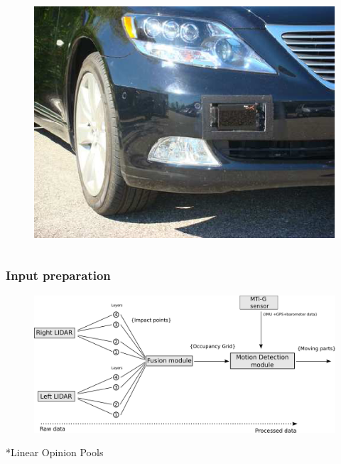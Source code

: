\documentclass{beamer}
\begin{document}
\begin{frame}
\begin{columns}[t]
		  \begin{column}{5cm}
		  \begin{figure}[h]
			\center
			\includegraphics[scale=0.26]{../img/testbed:ibeo}
		  \end{figure}   
		  \end{column}
		 \end{columns}		 
	\end{frame}	

	\begin{frame}
		\frametitle{Input preparation}
		\begin{figure}[h]
			\center
			\includegraphics[scale=0.18]{../img/fig:motion:framework}
		\end{figure}
	
		*Linear Opinion Pools \cite{ADARVE-2012-671211}
	
	\end{frame}
\end{document}
